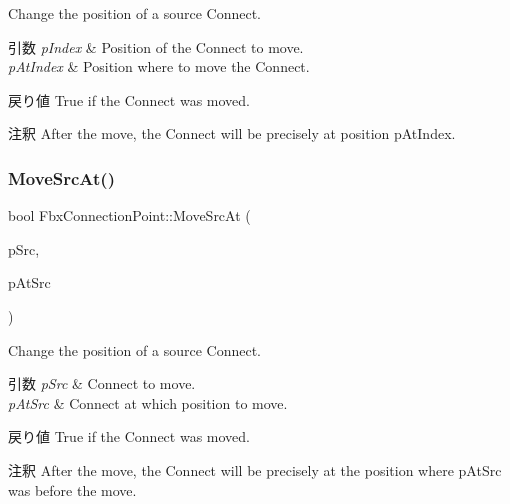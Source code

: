 Change the position of a source Connect. 
\begin{DoxyParams}{引数}
{\em p\+Index} & Position of the Connect to move. \\
\hline
{\em p\+At\+Index} & Position where to move the Connect. \\
\hline
\end{DoxyParams}
\begin{DoxyReturn}{戻り値}
{\ttfamily True} if the Connect was moved. 
\end{DoxyReturn}
\begin{DoxyRemark}{注釈}
After the move, the Connect will be precisely at position p\+At\+Index. 
\end{DoxyRemark}
\mbox{\label{class_fbx_connection_point_a23302c72f75632bec8b48f3f3fe8e783}} 
\subsubsection{\texorpdfstring{Move\+Src\+At()}{MoveSrcAt()}\hspace{0.1cm}{\footnotesize\ttfamily [2/2]}}
{\footnotesize\ttfamily bool Fbx\+Connection\+Point\+::\+Move\+Src\+At (\begin{DoxyParamCaption}\item[{\hyperlink{class_fbx_connection_point}{Fbx\+Connection\+Point} $\ast$}]{p\+Src,  }\item[{\hyperlink{class_fbx_connection_point}{Fbx\+Connection\+Point} $\ast$}]{p\+At\+Src }\end{DoxyParamCaption})}

Change the position of a source Connect. 
\begin{DoxyParams}{引数}
{\em p\+Src} & Connect to move. \\
\hline
{\em p\+At\+Src} & Connect at which position to move. \\
\hline
\end{DoxyParams}
\begin{DoxyReturn}{戻り値}
{\ttfamily True} if the Connect was moved. 
\end{DoxyReturn}
\begin{DoxyRemark}{注釈}
After the move, the Connect will be precisely at the position where p\+At\+Src was before the move. 
\end{DoxyRemark}
\mbox{\label{class_fbx_connection_point_ad7a2a088589958e0f7d85eb39c1fc173}} 
